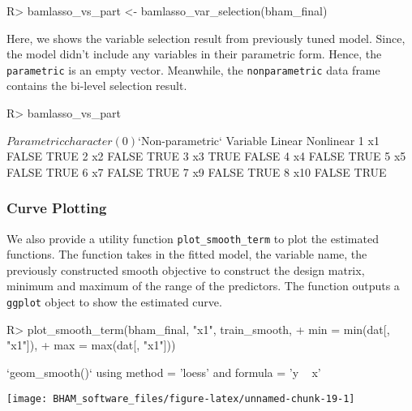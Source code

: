\documentclass[
]{jss}
\begin{document}
\begin{CodeChunk}
\begin{CodeInput}
R> bamlasso_vs_part <- bamlasso_var_selection(bham_final)
\end{CodeInput}
\end{CodeChunk}

Here, we shows the variable selection result from previously tuned
model. Since, the model didn't include any variables in their parametric
form. Hence, the \texttt{parametric} is an empty vector. Meanwhile, the
\texttt{nonparametric} data frame contains the bi-level selection
result.

\begin{CodeChunk}
\begin{CodeInput}
R> bamlasso_vs_part
\end{CodeInput}
\begin{CodeOutput}
$Parametric
character(0)

$`Non-parametric`
  Variable Linear Nonlinear
1       x1  FALSE      TRUE
2       x2  FALSE      TRUE
3       x3   TRUE     FALSE
4       x4  FALSE      TRUE
5       x5  FALSE      TRUE
6       x7  FALSE      TRUE
7       x9  FALSE      TRUE
8      x10  FALSE      TRUE
\end{CodeOutput}
\end{CodeChunk}

\subsubsection{Curve Plotting}

We also provide a utility function \texttt{plot\_smooth\_term} to plot
the estimated functions. The function takes in the fitted model, the
variable name, the previously constructed smooth objective to construct
the design matrix, minimum and maximum of the range of the predictors.
The function outputs a \texttt{ggplot} object to show the estimated
curve.

\begin{CodeChunk}
\begin{CodeInput}
R> plot_smooth_term(bham_final, "x1", train_smooth,
+                      min = min(dat[, "x1"]),
+                      max = max(dat[, "x1"]))
\end{CodeInput}
\begin{CodeOutput}
`geom_smooth()` using method = 'loess' and formula = 'y ~ x'
\end{CodeOutput}


\begin{center}\texttt{[image: BHAM\_software\_files/figure-latex/unnamed-chunk-19-1]} \end{center}

\end{CodeChunk}
\end{document}
